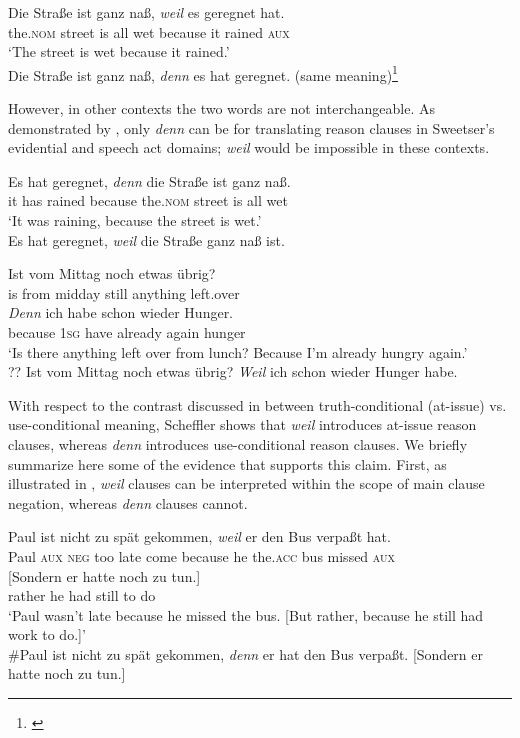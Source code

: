 \ea \label{ex:18.28}
\ea  \gll  Die  Straße  ist  ganz  naß,  \textit{weil}  es  geregnet  hat.\\
the.\textsc{nom}  street  is  all  wet  because  it  rained  \textsc{aux}\\
\glt ‘The street is wet because it rained.’ \\
\ex Die Straße ist ganz naß, \textit{denn} es hat geregnet. (same meaning)\footnote{\citet[§3.1]{Scheffler2008}}
\z \z

However, in other contexts the two words are not interchangeable. As demonstrated by \citet{Scheffler2005,Scheffler2008}, only \textit{denn} can be for translating reason clauses in Sweetser’s evidential  and speech act  domains; \textit{weil} would be impossible in these contexts.


\ea \label{ex:18.29}
\ea  \gll  Es hat geregnet, \textit{denn} die Straße ist ganz naß.\\
it  has rained because the.\textsc{nom}  street  is  all  wet \\
\glt ‘It was raining, because the street is wet.’ \\
\ex *Es hat geregnet, \textit{weil} die Straße ganz naß ist.
                       \z
\z

\ea \label{ex:18.30}
\ea  \gll Ist  vom  Mittag  noch  etwas  übrig?\\
is  from  midday  still  anything  left.over\\
\gll \textit{Denn}  ich  habe  schon  wieder  Hunger.\\
because  \textsc{1sg}  have  already  again  hunger\\
\glt ‘Is there anything left over from lunch? Because I’m already hungry again.’ \\
\ex ?? Ist vom Mittag noch etwas übrig? \textit{Weil} ich schon wieder Hunger habe.
\z \z


With respect to the contrast discussed in  between truth-conditional (at-issue) vs. use-conditional meaning, Scheffler shows that \textit{weil} introduces at-issue reason clauses, whereas \textit{denn} introduces use-conditional reason clauses. We briefly summarize here some of the evidence that supports this claim. First, as illustrated in , \textit{weil} clauses can be interpreted within the scope of main clause negation, whereas \textit{denn} clauses cannot.


\ea \label{ex:18.34}
\ea  \gll  Paul  ist  nicht  zu  spät  gekommen,  \textit{weil}  er  den  Bus  verpaßt  hat.\\
Paul  \textsc{aux}  \textsc{neg}  too  late  come  because  he  the.\textsc{acc}  bus  missed  \textsc{aux}\\
\gll   {}[Sondern  er  hatte  noch  zu  tun.]\\
  rather  he  had  still  to  do\\
  \glt ‘Paul wasn’t late because he missed the bus. [But rather, because he still had work to do.]’ \\
\ex  \#Paul ist nicht zu spät gekommen, \textit{denn} er hat den Bus verpaßt. [Sondern er hatte noch zu tun.]
\z \z


